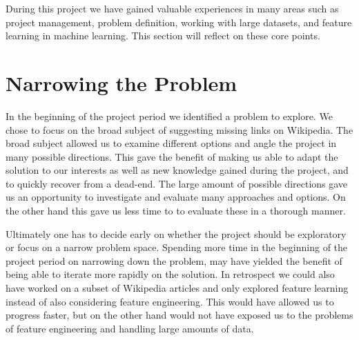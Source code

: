 
During this project we have gained valuable experiences in many areas such as project management, problem definition, working with large datasets, and feature learning in machine learning. This section will reflect on these core points.

\section{Narrowing the Problem}
In the beginning of the project period we identified a problem to explore. We chose to focus on the broad subject of suggesting missing links on Wikipedia. The broad subject allowed us to examine different options and angle the project in many possible directions. This gave the benefit of making us able to adapt the solution to our interests as well as new knowledge gained during the project, and to quickly recover from a dead-end. The large amount of possible directions gave us an opportunity to investigate and evaluate many approaches and options. On the other hand this gave us less time to to evaluate these in a thorough manner.

Ultimately one has to decide early on whether the project should be exploratory or focus on a narrow problem space. Spending more time in the beginning of the project period on narrowing down the problem, may have yielded the benefit of being able to iterate more rapidly on the solution. In retrospect we could also have worked on a subset of Wikipedia articles and only explored feature learning instead of also considering feature engineering. This would have allowed us to progress faster, but on the other hand would not have exposed us to the problems of feature engineering and handling large amounts of data.

